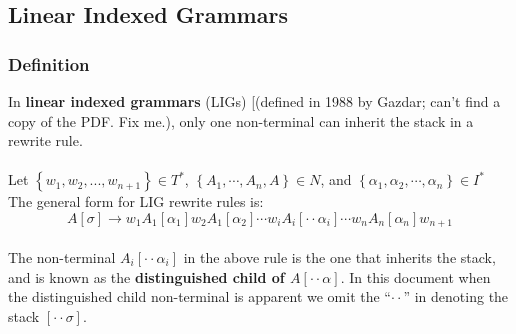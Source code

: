 \documentclass[11pt]{article}
\begin{document}
\subsection {Linear Indexed Grammars}
\subsubsection {Definition}
In {\bf linear indexed grammars} (LIGs) [(defined in 1988 by Gazdar; can't find a copy of the PDF. Fix me.), only one non-terminal can inherit the stack in a rewrite rule.\\ \\
Let $\left \{ w_1, w_2, ..., w_{n+1} \right \} \in T^*$, $\left \{ A_1, \cdots, A_n, A \right \} \in N$, and $\left \{\alpha_1, \alpha_2, \cdots, \alpha_n \right \} \in I^*$ \\
The general form for LIG rewrite rules is:\\
\[
A[\sigma] \rightarrow w_1 A_1[\alpha_1] w_2 A_1[\alpha_2] \cdots w_i A_i[\cdot \cdot \alpha_i] \cdots w_n A_n[\alpha_n] w_{n+1}
\]
\ \\
The non-terminal $A_i[\cdot \cdot \alpha_i]$ in the above rule is the one that inherits the stack, and is known as the {\bf distinguished child of $A[\cdot \cdot \alpha]$}.
In this document when the distinguished child non-terminal is apparent we omit the ``$\cdot \cdot$'' in denoting the stack $[\cdot \cdot \sigma]$.
\end{document}
